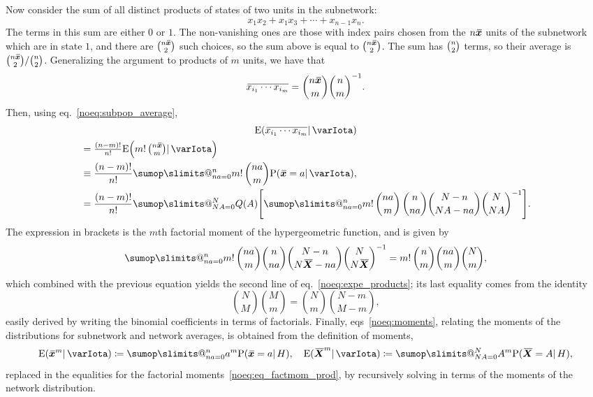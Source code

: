 \documentclass{article}
\makeatletter
\theoremstyle{remark}
\theoremstyle{innote}
\def\sum{\DOTSI\sumop\slimits@}
\newcommand*{\citep}{\parencites}
\newcommand*{\defd}{\coloneqq}
\renewcommand*{\|}{\mathpunct{|}}%
\newcommand*{\p}{\mathrm{P}}%
\newcommand*{\eqn}{eq.}%
\newcommand*{\eqns}{eqs}%
\newcommand*{\E}{\mathrm{E}}
\DeclarePairedDelimiter\expp{(}{)}
\newcommand*{\expe}{\E\expp}%
\theoremstyle{simple}
\newcommand*{\widebar}[1]{{\mkern1.5mu\skew{2}\overline{\mkern-1.5mu#1\mkern-1.5mu}\mkern 1.5mu}}
\newcommand*{\av}{\widebar} %
\newcommand*{\sav}{\widebar} %
\newcommand*{\yxx}{x}%
\newcommand*{\yx}{\bm{\yxx}}%
\newcommand*{\yxs}{\sav{\yx}}%
\newcommand*{\yX}{\bm{X}}%
\newcommand*{\yXf}{\av{\yX}}%
\newcommand*{\yH}{\varIota}
\makeatother
\begin{document}
  Now consider the sum of all distinct products of states of two units in
  the subnetwork:
  \begin{equation*}
    x_1 x_2 + x_1 x_3 + \dotsb + x_{n-1} x_n.
  \end{equation*}
  The terms in this sum are either $0$ or $1$. The non-vanishing ones are
  those with index pairs chosen from the $n\yxs$ units of the subnetwork
  which are in state $1$, and there are $\tbinom{n\yxs}{2}$ such choices,
  so the sum above is equal to $\tbinom{n\yxs}{2}$. The sum has
  $\tbinom{n}{2}$ terms, so their average is
  $\tbinom{n\yxs}{2}/\tbinom{n}{2}$. Generalizing the argument to products
  of $m$ units, we have that
  \begin{equation}
    \sav{x_{i_1} \dotsm x_{i_m}} = \binom{n\yxs}{m} \binom{n}{m}^{-1}.
  \end{equation}
  Then, using \eqn~\eqref{noeq:subpop_average},
  \begin{multline}
    \label{noeq:expect_product_m}
    \expe*{\sav{x_{i_1} \dotsm x_{i_m}} \| \yH}
    \\
    \begin{aligned}[b]
      &=\tfrac{(n-m)!}{n!}
      \expe*{m!\,\tbinom{n\yxs}{m}  \| \yH}
      \\
      &\equiv\frac{(n-m)!}{n!}
      \sum_{n a=0}^n m!\, \binom{n a}{m} \p(\yxs =a \|\yH),
      \\
      &=\frac{(n-m)!}{n!} \sum_{N A=0}^N
      Q( A)
      \Biggl[ 
      \sum_{n a=0}^n 
      m!\,\binom{n a}{m}\, \binom{n}{n a}\binom{N-n}{N A-n a}\binom{N}{N A}^{-1} 
      \Biggr].
    \end{aligned}
  \end{multline}
  The expression in brackets is the $m$th factorial moment of the
  hypergeometric function, and is given by \citep{potts1953}
  \begin{equation}
    \sum_{n a=0}^n m!\,\binom{n a}{m} \binom{n}{n a}\binom{N-n}{N\yXf-n a}
    \binom{N}{N\yXf}^{-1} 
    =
    m!\,\binom{n}{m} \binom{n a}{m}\binom{N}{m},
  \end{equation}
  which combined with the previous equation yields the second line of
  \eqn~\eqref{noeq:expe_products}; its last equality comes from the identity
  \begin{equation}
    \label{noeq:binom_identity}
    \binom{N}{M}\binom{M}{m}=\binom{N}{m}\binom{N-m}{M-m},
  \end{equation}
  easily derived by writing the binomial coefficients in terms of
  factorials. Finally, \eqns~\eqref{noeq:moments}, relating the moments of
  the distributions for subnetwork and network averages, is obtained
  from the definition of moments,
  \begin{equation}
    \label{noeq:moments_def}
    \expe*{\yxs^m \| \yH} \defd
    \sum_{n a=0}^{n} a^m \p(\yxs = a  \| H),
    \quad
    \expe{\yXf^m \| \yH} \defd
    \sum_{N A=0}^{N} A^m \p(\yXf = A  \| H),
  \end{equation}
  replaced in the equalities for the factorial
  moments~\eqref{noeq:eq_factmom_prod}, by recursively solving in terms of
  the moments of the network distribution.
\end{document}
